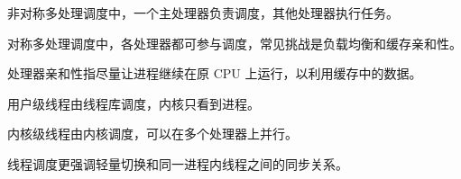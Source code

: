 \begin{points}
  \item 非对称多处理调度中，一个主处理器负责调度，其他处理器执行任务。
  \item 对称多处理调度中，各处理器都可参与调度，常见挑战是负载均衡和缓存亲和性。
  \item 处理器亲和性指尽量让进程继续在原 CPU 上运行，以利用缓存中的数据。
\end{points}


\begin{points}
  \item 用户级线程由线程库调度，内核只看到进程。
  \item 内核级线程由内核调度，可以在多个处理器上并行。
  \item 线程调度更强调轻量切换和同一进程内线程之间的同步关系。
\end{points}


